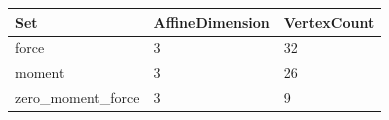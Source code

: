 \begin{tabular}{@{}lll@{}}
\toprule
Set & AffineDimension & VertexCount \\
\midrule
force & 3 & 32 \\
moment & 3 & 26 \\
zero\_moment\_force & 3 & 9 \\
\bottomrule
\end{tabular}
